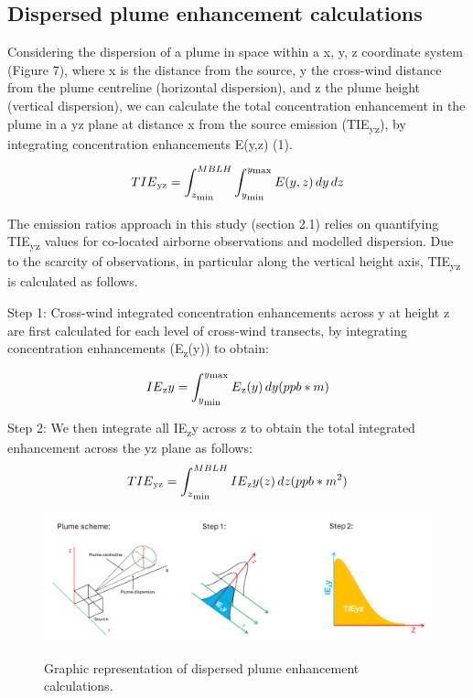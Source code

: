 \documentclass[12pt]{article}
\begin{document}
\subsection{Dispersed plume enhancement calculations
}
Considering the dispersion of a plume in space within a {x, y, z} coordinate system (Figure 7), where x is the distance from the source, y the cross-wind distance from the plume centreline (horizontal dispersion), and z the plume height (vertical dispersion), we can calculate the total concentration enhancement in the plume in a yz plane at distance x from the source emission (TIE\textsubscript{yz}), by integrating concentration enhancements E(y,z) (1). 

\begin{equation}
TIE\textsubscript{yz} = \int_{z\textsubscript{min}}^{MBLH} \int_{y\textsubscript{min}}^{y\textsubscript{max}} E(y,z) \, dy \, dz
\end{equation}

The emission ratios approach in this study (section 2.1) relies on quantifying TIE\textsubscript{yz} values for co-located airborne observations and modelled dispersion.  Due to the scarcity of observations, in particular along the vertical height axis, TIE\textsubscript{yz} is calculated as follows.



Step 1: Cross-wind integrated concentration enhancements across y at height z are first calculated for each  level of cross-wind transects, by integrating concentration enhancements (E\textsubscript{z}(y))  to obtain:

\begin{equation}
IE\textsubscript{z}y = \int_{y\textsubscript{min}}^{y\textsubscript{max}} E\textsubscript{z}(y) \, dy   (ppb*m)
\end{equation}

Step 2: We then integrate all IE\textsubscript{z}y across z to obtain the total integrated enhancement across the yz plane as follows:
\begin{equation}
TIE\textsubscript{yz}  = \int_{z\textsubscript{min}}^{MBLH} IE\textsubscript{z}y(z) \, dz (ppb*m\textsuperscript{2})
\end{equation}

\begin{figure}[H]
\centering
\includegraphics[width=1\textwidth]{Plots/gaussian plume calc.png}
\caption{\label{fig:volume source}} Graphic representation of dispersed plume enhancement calculations.  
\end{figure}
\end{document}
